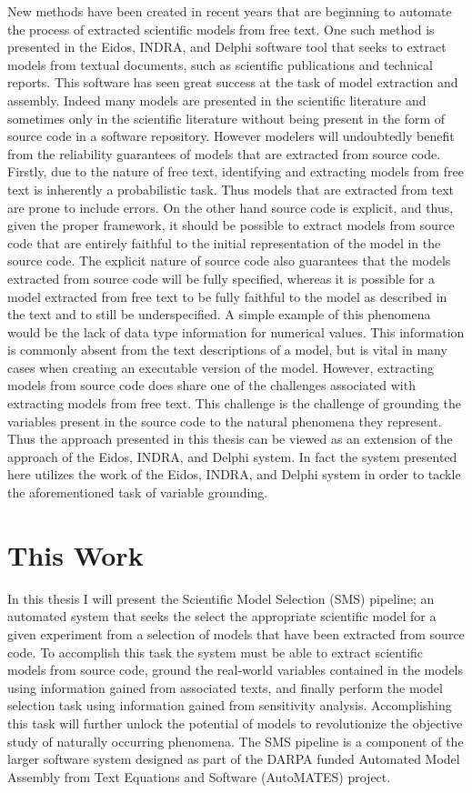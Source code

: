 New methods have been created in recent years that are beginning to automate the process of extracted scientific models from free text. One such method is presented in the Eidos, INDRA, and Delphi software tool that seeks to extract models from textual documents, such as scientific publications and technical reports. This software has seen great success at the task of model extraction and assembly. Indeed many models are presented in the scientific literature and sometimes only in the scientific literature without being present in the form of source code in a software repository. However modelers will undoubtedly benefit from the reliability guarantees of models that are extracted from source code. Firstly, due to the nature of free text, identifying and extracting models from free text is inherently a probabilistic task. Thus models that are extracted from text are prone to include errors. On the other hand source code is explicit, and thus, given the proper framework, it should be possible to extract models from source code that are entirely faithful to the initial representation of the model in the source code. The explicit nature of source code also guarantees that the models extracted from source code will be fully specified, whereas it is possible for a model extracted from free text to be fully faithful to the model as described in the text and to still be underspecified. A simple example of this phenomena would be the lack of data type information for numerical values. This information is commonly absent from the text descriptions of a model, but is vital in many cases when creating an executable version of the model. However, extracting models from source code does share one of the challenges associated with extracting models from free text. This challenge is the challenge of grounding the variables present in the source code to the natural phenomena they represent. Thus the approach presented in this thesis can be viewed as an extension of the approach of the Eidos, INDRA, and Delphi system. In fact the system presented here utilizes the work of the Eidos, INDRA, and Delphi system in order to tackle the aforementioned task of variable grounding.

\section{This Work\label{sec:this_work}}
In this thesis I will present the Scientific Model Selection (SMS) pipeline; an automated system that seeks the select the appropriate scientific model for a given experiment from a selection of models that have been extracted from source code.
To accomplish this task the system must be able to extract scientific models from source code, ground the real-world variables contained in the models using information gained from associated texts, and finally perform the model selection task using information gained from sensitivity analysis.
Accomplishing this task will further unlock the potential of models to revolutionize the objective study of naturally occurring phenomena.
The SMS pipeline is a component of the larger software system designed as part of the DARPA funded Automated Model Assembly from Text Equations and Software (AutoMATES) project.

